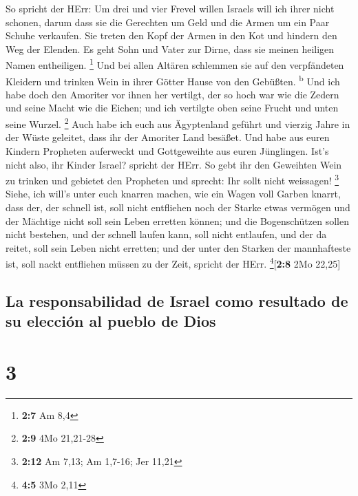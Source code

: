  So spricht der HErr: Um drei und vier Frevel willen
Israels will ich ihrer nicht schonen, darum dass sie die Gerechten um
Geld und die Armen um ein Paar Schuhe verkaufen.  Sie
treten den Kopf der Armen in den Kot und hindern den Weg der Elenden. Es
geht Sohn und Vater zur Dirne, dass sie meinen heiligen Namen
entheiligen. \footnote{\textbf{2:7} Am 8,4}  Und bei allen
Altären schlemmen sie auf den verpfändeten Kleidern und trinken Wein in
ihrer Götter Hause von den Gebüßten. \textsuperscript{b} 
Und ich habe doch den Amoriter vor ihnen her vertilgt, der so hoch war
wie die Zedern und seine Macht wie die Eichen; und ich vertilgte oben
seine Frucht und unten seine Wurzel. \footnote{\textbf{2:9} 4Mo 21,21-28}
 Auch habe ich euch aus Ägyptenland geführt und vierzig
Jahre in der Wüste geleitet, dass ihr der Amoriter Land besäßet.
 Und habe aus euren Kindern Propheten auferweckt und
Gottgeweihte aus euren Jünglingen. Ist's nicht also, ihr Kinder Israel?
spricht der HErr.  So gebt ihr den Geweihten Wein zu
trinken und gebietet den Propheten und sprecht: Ihr sollt nicht
weissagen! \footnote{\textbf{2:12} Am 7,13; Am 1,7-16; Jer 11,21}
 Siehe, ich will's unter euch knarren machen, wie ein
Wagen voll Garben knarrt,  dass der, der schnell ist,
soll nicht entfliehen noch der Starke etwas vermögen und der Mächtige
nicht soll sein Leben erretten können;  und die
Bogenschützen sollen nicht bestehen, und der schnell laufen kann, soll
nicht entlaufen, und der da reitet, soll sein Leben nicht erretten;
 und der unter den Starken der mannhafteste ist, soll
nackt entfliehen müssen zu der Zeit, spricht der HErr.
\footnote{\textbf{4:5} 3Mo 2,11}{[}\textbf{2:8} 2Mo 22,25{]}

\hypertarget{la-responsabilidad-de-israel-como-resultado-de-su-elecciuxf3n-al-pueblo-de-dios}{%
\subsection{La responsabilidad de Israel como resultado de su elección
al pueblo de
Dios}\label{la-responsabilidad-de-israel-como-resultado-de-su-elecciuxf3n-al-pueblo-de-dios}}

\hypertarget{section-2}{%
\section{3}\label{section-2}}

